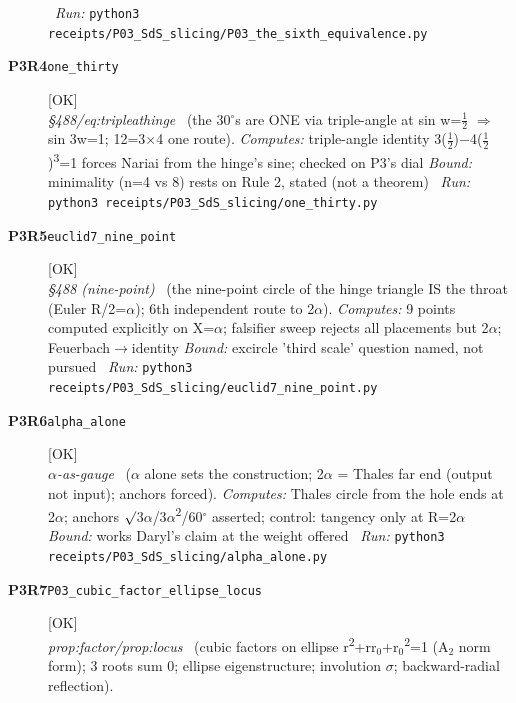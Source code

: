 \begin{description}
\ \emph{Run:} \texttt{python3 receipts/P03\_SdS\_slicing/P03\_the\_sixth\_equivalence.py}
\item[\rcptlabel{one_thirty}{P3R4}\textbf{P3R4}\quad\texttt{one\_thirty}]\hfill\textsf{[OK]}\\
\textit{\S{}488/eq:tripleathinge} \ (the 30\ensuremath{^\circ}s are ONE via triple-angle at sin w=\ensuremath{\tfrac12} \ensuremath{\Rightarrow} sin 3w=1; 12=3\ensuremath{\times}4 one route). 
\emph{Computes:} triple-angle identity 3(\ensuremath{\tfrac12})\ensuremath{-}4(\ensuremath{\tfrac12})\textsuperscript{3}=1 forces Nariai from the hinge's sine; checked on P3's dial
 \emph{Bound:} minimality (n=4 vs 8) rests on Rule 2, stated (not a theorem)
\ \emph{Run:} \texttt{python3 receipts/P03\_SdS\_slicing/one\_thirty.py}
\item[\rcptlabel{euclid7_nine_point}{P3R5}\textbf{P3R5}\quad\texttt{euclid7\_nine\_point}]\hfill\textsf{[OK]}\\
\textit{\S{}488 (nine-point)} \ (the nine-point circle of the hinge triangle IS the throat (Euler R/2=\ensuremath{\alpha}); 6th independent route to 2\ensuremath{\alpha}). 
\emph{Computes:} 9 points computed explicitly on \textbar{}X\textbar{}=\ensuremath{\alpha}; falsifier sweep rejects all placements but 2\ensuremath{\alpha}; Feuerbach\ensuremath{\to}identity
 \emph{Bound:} excircle 'third scale' question named, not pursued
\ \emph{Run:} \texttt{python3 receipts/P03\_SdS\_slicing/euclid7\_nine\_point.py}
\item[\rcptlabel{alpha_alone}{P3R6}\textbf{P3R6}\quad\texttt{alpha\_alone}]\hfill\textsf{[OK]}\\
\textit{\ensuremath{\alpha}-as-gauge} \ (\ensuremath{\alpha} alone sets the construction; 2\ensuremath{\alpha} = Thales far end (output not input); anchors forced). 
\emph{Computes:} Thales circle from the hole ends at 2\ensuremath{\alpha}; anchors \ensuremath{\surd}3\ensuremath{\alpha}/3\ensuremath{\alpha}\textsuperscript{2}/60\ensuremath{^\circ} asserted; control: tangency only at R=2\ensuremath{\alpha}
 \emph{Bound:} works Daryl's claim at the weight offered
\ \emph{Run:} \texttt{python3 receipts/P03\_SdS\_slicing/alpha\_alone.py}
\item[\rcptlabel{P03_cubic_factor_ellipse_locus}{P3R7}\textbf{P3R7}\quad\texttt{P03\_cubic\_factor\_ellipse\_locus}]\hfill\textsf{[OK]}\\
\textit{prop:factor/prop:locus} \ (cubic factors on ellipse r\textsuperscript{2}+rr\ensuremath{_0}+r\ensuremath{_0}\textsuperscript{2}=1 (A\ensuremath{_2} norm form); 3 roots sum 0; ellipse eigenstructure; involution \ensuremath{\sigma}; backward-radial reflection). 

\end{description}
